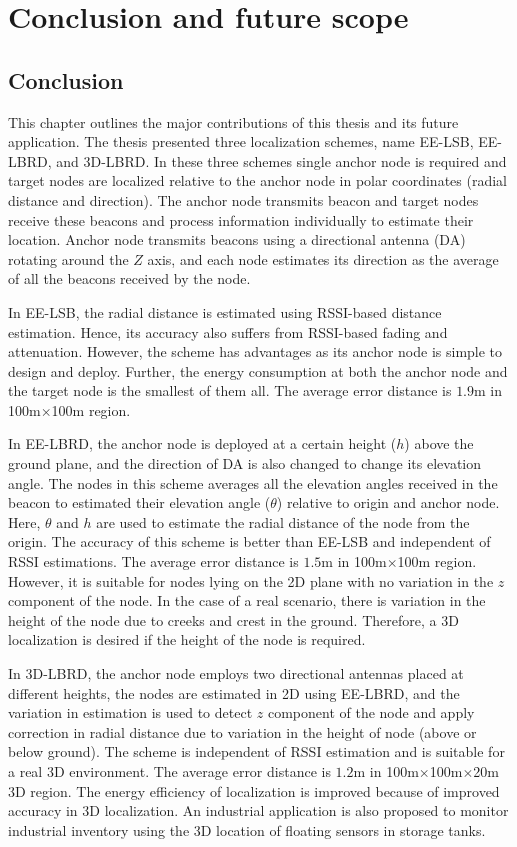 \chapter{Conclusion and future scope\label{ch:CON}}
\section{Conclusion}
This chapter outlines the major contributions of this thesis and its future application.
The thesis presented three localization schemes, name EE-LSB, EE-LBRD, and 3D-LBRD. In these three schemes single anchor node is required and target nodes are localized relative to the anchor node in polar coordinates (radial distance and direction). The anchor node transmits beacon and target nodes receive these beacons and process information individually to estimate their location. Anchor node transmits beacons using a directional antenna (DA) rotating around the $Z$ axis, and each node estimates its direction as the average of all the beacons received by the node.
\par In EE-LSB, the radial distance is estimated using RSSI-based distance estimation. Hence, its accuracy also suffers from RSSI-based fading and attenuation. However, the scheme has advantages as its anchor node is simple to design and deploy. Further, the energy consumption at both the anchor node and the target node is the smallest of them all. The average error distance is $1.9$m in 100m$\times$100m region.
\par In EE-LBRD, the anchor node is deployed at a certain height ($h$) above the ground plane, and the direction of DA is also changed to change its elevation angle. The nodes in this scheme averages all the elevation angles received in the beacon to estimated their elevation angle ($\theta$) relative to origin and anchor node. Here, $\theta$ and $h$ are used to estimate the radial distance of the node from the origin. The accuracy of this scheme is better than EE-LSB and independent of RSSI estimations. The average error distance is $1.5$m in 100m$\times$100m region. However, it is suitable for nodes lying on the 2D plane with no variation in the $z$ component of the node. In the case of a real scenario, there is variation in the height of the node due to creeks and crest in the ground. Therefore, a 3D localization is desired if the height of the node is required.
\par In 3D-LBRD, the anchor node employs two directional antennas placed at different heights, the nodes are estimated in 2D using EE-LBRD, and the variation in estimation is used to detect $z$ component of the node and apply correction in radial distance due to variation in the height of node (above or below ground). The scheme is independent of RSSI estimation and is suitable for a real 3D environment. The average error distance is $1.2$m in 100m$\times$100m$\times$20m 3D region. The energy efficiency of localization is improved because of improved accuracy in 3D localization. An industrial application is also proposed to monitor industrial inventory using the 3D location of floating sensors in storage tanks.
